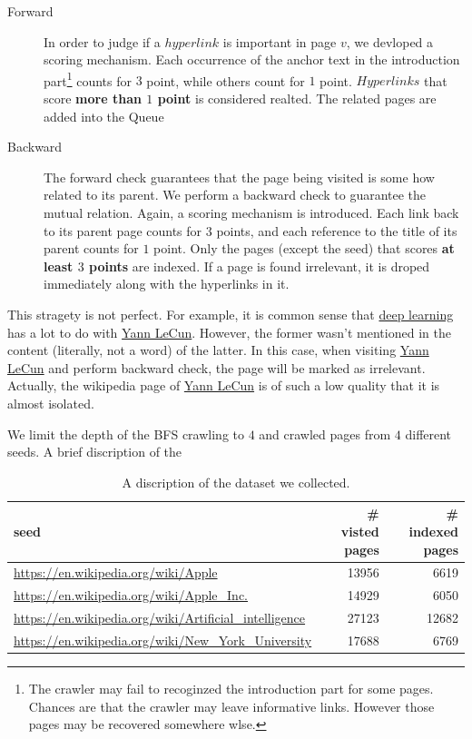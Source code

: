 \documentclass[12pt]{amsart}
\newcommand{\0}{\mat{0}}
\newcommand{\1}{\mathds{1}}
\begin{document}
\begin{description}
\item[Forward] In order to judge if a $hyperlink$ is important in page $v$, we devloped a scoring mechanism. Each occurrence of the anchor text in the introduction part\footnote{The crawler may fail to recoginzed the introduction part for some pages. Chances are that the crawler may leave informative links. However those pages may be recovered somewhere wlse. } counts for $3$ point, while others count for $1$ point. $Hyperlinks$ that score \textbf{more than $1$ point} is considered realted. The related pages are added into the Queue
\item[Backward] The forward check guarantees that the page being visited is some how related to its parent. We perform a backward check to guarantee the mutual relation. Again, a scoring mechanism is introduced. Each link back to its parent page counts for $3$ points, and each reference to the title of its parent counts for $1$ point. Only the pages (except the seed) that scores \textbf{at least $3$ points} are indexed. If a page is found irrelevant, it is droped immediately along with the hyperlinks in it. 
\end{description}

This stragety is not perfect. For example, it is common sense that \href{https://en.wikipedia.org/wiki/Deep\_learning}{deep learning} has a lot to do with \href{https://en.wikipedia.org/wiki/Yann\_LeCun}{Yann LeCun}. However, the former wasn't mentioned in the content (literally, not a word) of the latter. In this case, when visiting \href{https://en.wikipedia.org/wiki/Yann\_LeCun}{Yann LeCun} and perform backward check, the page will be marked as irrelevant. Actually, the wikipedia page of  \href{https://en.wikipedia.org/wiki/Yann\_LeCun}{Yann LeCun} is of such a low quality that it is almost isolated. 

We limit the depth of the BFS crawling to $4$ and crawled pages from $4$ different seeds. A brief discription of the 

\begin{table}[htb]
\centering
\begin{tabular}{|l|r|r|}\hline
seed & \# visted pages & \# indexed pages \\ \hline
\href{https://en.wikipedia.org/wiki/Apple}{\textsf{https://en.wikipedia.org/wiki/Apple}} & 13956 & 6619 \\ \hline
\href{https://en.wikipedia.org/wiki/Apple\_Inc.}{\textsf{https://en.wikipedia.org/wiki/Apple\_Inc.}} & 14929 & 6050 \\ \hline
\href{https://en.wikipedia.org/wiki/Artificial\_intelligence}{\textsf{https://en.wikipedia.org/wiki/Artificial\_intelligence}} & 27123 & 12682 \\ \hline
\href{https://en.wikipedia.org/wiki/New\_York\_University}{\textsf{https://en.wikipedia.org/wiki/New\_York\_University}} & 17688 & 6769 \\ \hline 
\end{tabular}
\caption{A discription of the dataset we collected. }
\label{tbl:dataset}
\end{table}
\end{document}
